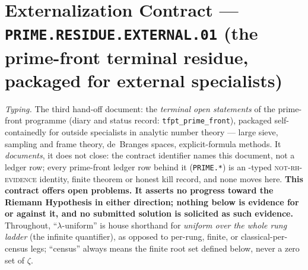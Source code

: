 \documentclass[11pt,a4paper]{article}
\begin{document}
\section*{Externalization Contract --- \texttt{PRIME.RESIDUE.EXTERNAL.01} (the prime-front terminal residue, packaged for external specialists)}
\noindent\emph{Typing.} The third hand-off document: the \emph{terminal open statements} of the
prime-front programme (diary and status record: \texttt{tfpt\_prime\_front}), packaged
self-containedly for outside specialists in analytic number theory --- large sieve, sampling and
frame theory, de~Branges spaces, explicit-formula methods.  It \emph{documents}, it does not
close: the contract identifier names this document, not a ledger row; every prime-front ledger
row behind it (\texttt{PRIME.*}) is an \mE-typed \textsc{not-rh-evidence} identity, finite
theorem or honest kill record, and none moves here.  \textbf{This contract offers open problems.
It asserts no progress toward the Riemann Hypothesis in either direction; nothing below is
evidence for or against it, and no submitted solution is solicited as such evidence.}
Throughout, ``$\lambda$-uniform'' is house shorthand for \emph{uniform over the whole rung
ladder} (the infinite quantifier), as opposed to per-rung, finite, or classical-per-census legs;
``census'' always means the finite root set defined below, never a zero set of $\zeta$.
\end{document}
